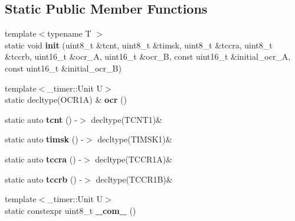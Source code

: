 \subsection*{Static Public Member Functions}
\begin{DoxyCompactItemize}
\item 
\hypertarget{struct__timer1_1_1TimerDef_a3f8c9827b8d6cf2ba3cc058f9755f9c9}{}\label{struct__timer1_1_1TimerDef_a3f8c9827b8d6cf2ba3cc058f9755f9c9} 
{\footnotesize template$<$typename T $>$ }\\static void {\bfseries init} (uint8\+\_\+t \&tcnt, uint8\+\_\+t \&timsk, uint8\+\_\+t \&tccra, uint8\+\_\+t \&tccrb, uint16\+\_\+t \&ocr\+\_\+A, uint16\+\_\+t \&ocr\+\_\+B, const uint16\+\_\+t \&initial\+\_\+ocr\+\_\+A, const uint16\+\_\+t \&initial\+\_\+ocr\+\_\+B)
\item 
\hypertarget{struct__timer1_1_1TimerDef_af3e2a25d73a3c8af06c8328835a06325}{}\label{struct__timer1_1_1TimerDef_af3e2a25d73a3c8af06c8328835a06325} 
{\footnotesize template$<$\+\_\+timer\+::\+Unit U$>$ }\\static decltype(O\+C\+R1A) \& {\bfseries ocr} ()
\item 
\hypertarget{struct__timer1_1_1TimerDef_a9ececf0f53fcbf2fedc714c7019b4fba}{}\label{struct__timer1_1_1TimerDef_a9ececf0f53fcbf2fedc714c7019b4fba} 
static auto {\bfseries tcnt} () -\/$>$ decltype(T\+C\+N\+T1)\&
\item 
\hypertarget{struct__timer1_1_1TimerDef_ac82f7a399eb905255b00ea08181c590e}{}\label{struct__timer1_1_1TimerDef_ac82f7a399eb905255b00ea08181c590e} 
static auto {\bfseries timsk} () -\/$>$ decltype(T\+I\+M\+S\+K1)\&
\item 
\hypertarget{struct__timer1_1_1TimerDef_ae283398749f8a7aec418c37d7c8db058}{}\label{struct__timer1_1_1TimerDef_ae283398749f8a7aec418c37d7c8db058} 
static auto {\bfseries tccra} () -\/$>$ decltype(T\+C\+C\+R1A)\&
\item 
\hypertarget{struct__timer1_1_1TimerDef_ae06bd4363e1e561541b89f5a6792af59}{}\label{struct__timer1_1_1TimerDef_ae06bd4363e1e561541b89f5a6792af59} 
static auto {\bfseries tccrb} () -\/$>$ decltype(T\+C\+C\+R1B)\&
\item 
\hypertarget{struct__timer1_1_1TimerDef_a33ee78373ffe25229c46569c4ef3414e}{}\label{struct__timer1_1_1TimerDef_a33ee78373ffe25229c46569c4ef3414e} 
{\footnotesize template$<$\+\_\+timer\+::\+Unit U$>$ }\\static constexpr uint8\+\_\+t {\bfseries \+\_\+com\+\_} ()
\item 
\hypertarget{struct__timer1_1_1TimerDef_a36587d5c690dd8828938384b1c427052}{}\label{struct__timer1_1_1TimerDef_a36587d5c690dd8828938384b1c427052} 

\end{DoxyCompactItemize}
